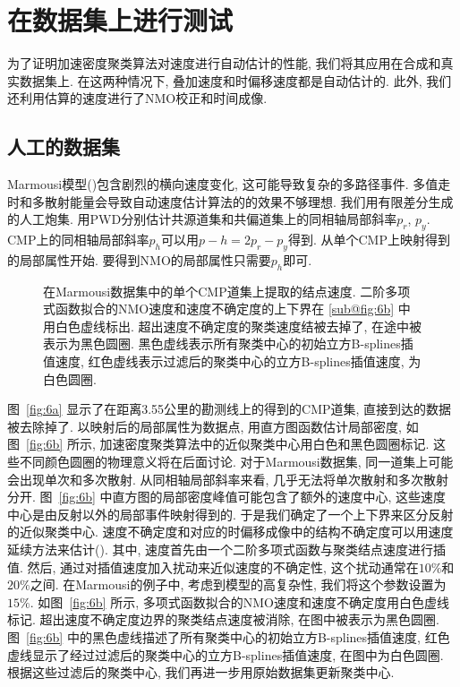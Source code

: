 \section{在数据集上进行测试}
为了证明加速密度聚类算法对速度进行自动估计的性能, 我们将其应用在合成和真实数据集上. 在这两种情况下, 叠加速度和时偏移速度都是自动估计的. 此外, 我们还利用估算的速度进行了NMO校正和时间成像. 
\subsection{人工的数据集}
Marmousi模型(\cite{Versteeg1994})包含剧烈的横向速度变化, 这可能导致复杂的多路径事件. 多值走时和多散射能量会导致自动速度估计算法的的效果不够理想. 我们用有限差分生成的人工炮集. 用PWD分别估计共源道集和共偏道集上的同相轴局部斜率$p_r$, $p_y$. CMP上的同相轴局部斜率$p_h$可以用$p-h = 2p_r - p_y$得到. 从单个CMP上映射得到的局部属性开始. 要得到NMO的局部属性只需要$p_h$即可. 
\begin{figure}[htb]
    \centering
    \caption{在Marmousi数据集中的单个CMP道集上提取的结点速度. 二阶多项式函数拟合的NMO速度和速度不确定度的上下界在 \ref{sub@fig:6b} 中用白色虚线标出. 超出速度不确定度的聚类速度结被去掉了, 在途中被表示为黑色圆圈. 黑色虚线表示所有聚类中心的初始立方B-splines插值速度, 红色虚线表示过滤后的聚类中心的立方B-splines插值速度, 为白色圆圈. \label{fig:6}}
\end{figure}
图~\ref{fig:6a} 显示了在距离3.55公里的勘测线上的得到的CMP道集, 直接到达的数据被去除掉了. 以映射后的局部属性为数据点, 用直方图函数估计局部密度, 如图~\ref{fig:6b} 所示, 加速密度聚类算法中的近似聚类中心用白色和黑色圆圈标记. 这些不同颜色圆圈的物理意义将在后面讨论. 对于Marmousi数据集, 同一道集上可能会出现单次和多次散射. 从同相轴局部斜率来看, 几乎无法将单次散射和多次散射分开. 图~\ref{fig:6b} 中直方图的局部密度峰值可能包含了额外的速度中心, 这些速度中心是由反射以外的局部事件映射得到的. 于是我们确定了一个上下界来区分反射的近似聚类中心. 速度不确定度和对应的时偏移成像中的结构不确定度可以用速度延续方法来估计(\cite{Fomel2014}). 其中, 速度首先由一个二阶多项式函数与聚类结点速度进行插值. 然后, 通过对插值速度加入扰动来近似速度的不确定性, 这个扰动通常在$10\%$和$20\%$之间. 在Marmousi的例子中, 考虑到模型的高复杂性, 我们将这个参数设置为$15\%$. 如图~\ref{fig:6b} 所示, 多项式函数拟合的NMO速度和速度不确定度用白色虚线标记. 超出速度不确定度边界的聚类结点速度被消除, 在图中被表示为黑色圆圈. 图~\ref{fig:6b} 中的黑色虚线描述了所有聚类中心的初始立方B-splines插值速度, 红色虚线显示了经过过滤后的聚类中心的立方B-splines插值速度, 在图中为白色圆圈. 根据这些过滤后的聚类中心, 我们再进一步用原始数据集更新聚类中心. 

